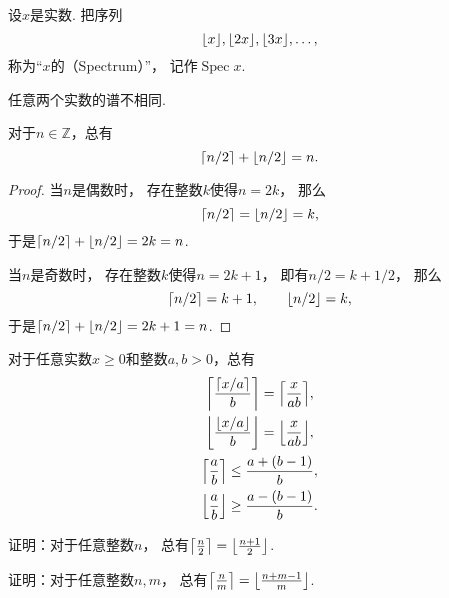 \begin{definition}
设\(x\)是实数.
把序列\begin{equation*}
	\floor{x},
	\floor{2x},
	\floor{3x},
	\dotsc,
\end{equation*}
称为“\(x\)的（Spectrum）”，
记作\(\operatorname{Spec} x\).
\end{definition}
\begin{proposition}
任意两个实数的谱不相同.
\end{proposition}

\begin{property}
对于\(n\in\mathbb{Z}\)，总有\begin{equation}
	\ceil{n/2} + \floor{n/2} = n.
\end{equation}
\begin{proof}
当\(n\)是偶数时，
存在整数\(k\)使得\(n=2k\)，
那么\begin{equation*}
	\ceil{n/2} = \floor{n/2} = k,
\end{equation*}
于是\(\ceil{n/2} + \floor{n/2} = 2k = n\).

当\(n\)是奇数时，
存在整数\(k\)使得\(n=2k+1\)，
即有\(n/2 = k + 1/2\)，
那么\begin{equation*}
	\ceil{n/2} = k+1,
	\qquad
	\floor{n/2} = k,
\end{equation*}
于是\(\ceil{n/2} + \floor{n/2} = 2k+1 = n\).
\end{proof}
\end{property}

\begin{property}
对于任意实数\(x \geq 0\)和整数\(a,b>0\)，总有\begin{gather}
	\ceil*{\frac{\ceil{x/a}}{b}} = \ceil*{\frac{x}{ab}}, \\
	\floor*{\frac{\floor{x/a}}{b}} = \floor*{\frac{x}{ab}}, \\
	\ceil*{\frac{a}{b}} \leq \frac{a+(b-1)}{b}, \\
	\floor*{\frac{a}{b}} \geq \frac{a-(b-1)}{b}.
\end{gather}
\end{property}

\begin{example}
证明：对于任意整数\(n\)，
总有\(\ceil*{\frac{n}2\vphantom{\frac12}} = \floor*{\frac{n+1}2}\).
\end{example}
\begin{example}
证明：对于任意整数\(n,m\)，
总有\(\ceil*{\frac{n}{m}\vphantom{\frac12}} = \floor*{\frac{n+m-1}{m}}\).
\end{example}


